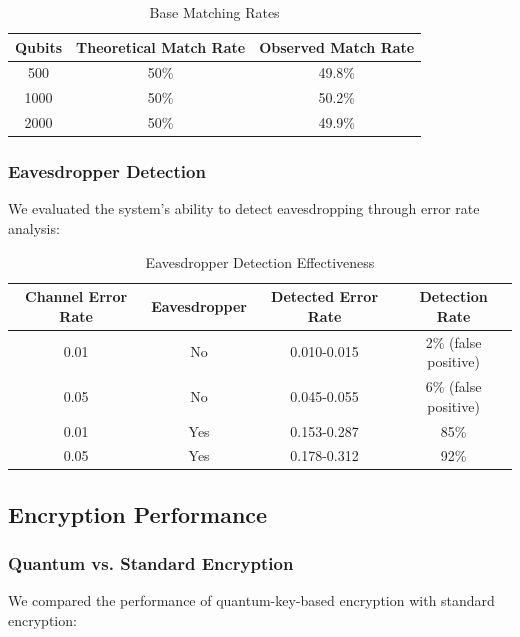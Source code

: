 \documentclass[onecolumn,a4paper,10pt]{IEEEtran}
\let\originalfloatbarrier\FloatBarrier
\renewcommand{\FloatBarrier}{\originalfloatbarrier}
\begin{document}
\begin{table}[htbp]
\centering
\begin{tabular}{|c|c|c|}
\hline
\textbf{Qubits} & \textbf{Theoretical Match Rate} & \textbf{Observed Match Rate} \\
\hline
500 & 50\% & 49.8\% \\
\hline
1000 & 50\% & 50.2\% \\
\hline
2000 & 50\% & 49.9\% \\
\hline
\end{tabular}
\caption{Base Matching Rates}
\label{tab:base_matching}
\end{table}

\FloatBarrier %

\subsubsection{Eavesdropper Detection}
We evaluated the system's ability to detect eavesdropping through error rate analysis:

\begin{table}[htbp]
\centering
\small
\begin{tabular}{|c|c|c|c|}
\hline
\textbf{Channel Error Rate} & \textbf{Eavesdropper} & \textbf{Detected Error Rate} & \textbf{Detection Rate} \\
\hline
0.01 & No & 0.010-0.015 & 2\% (false positive) \\
\hline
0.05 & No & 0.045-0.055 & 6\% (false positive) \\
\hline
0.01 & Yes & 0.153-0.287 & 85\% \\
\hline
0.05 & Yes & 0.178-0.312 & 92\% \\
\hline
\end{tabular}
\caption{Eavesdropper Detection Effectiveness}
\label{tab:eavesdropper_detection}
\end{table}

\FloatBarrier %

\subsection{Encryption Performance}

\subsubsection{Quantum vs. Standard Encryption}
We compared the performance of quantum-key-based encryption with standard encryption:
\end{document}
